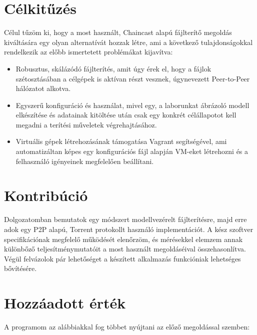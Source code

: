 \section{Célkitűzés}

Célul tűzöm ki, hogy a most használt, Chaincast alapú fájlterítő megoldás kiváltására egy olyan alternatívát hozzak létre, ami a következő tulajdonságokkal rendelkezik az előbb ismertetett problémákat kijavítva:

\begin{itemize}
  \item Robusztus, skálázódó fájlterítés, amit úgy érek el, hogy a fájlok szétosztásában a célgépek is aktívan részt vesznek, úgynevezett Peer-to-Peer\cite{p2pdef} hálózatot alkotva.
  \item Egyszerű konfiguráció és használat, mivel egy, a laborunkat ábrázoló modell elkészítése és adatainak kitöltése után csak egy konkrét célállapotot kell megadni a terítési műveletek végrehajtásához.
  \item Virtuális gépek létrehozásának támogatása Vagrant\cite{vagrant} segítségével, ami automatizáltan képes egy konfigurációs fájl alapján VM-eket létrehozni és a felhasználó igényeinek megfelelően beállítani.
\end{itemize}

\section{Kontribúció}
Dolgozatomban bemutatok egy módszert modellvezérelt fájlterítésre, majd erre adok egy P2P alapú, Torrent protokollt használó implementációt. A kész szoftver specifikációnak megfelelő működését elenőrzöm, és mérésekkel elemzem annak különbőző teljesítménymutatóit a most használt megoldáséival összehasonlítva. Végül felvázolok pár lehetőséget a készített alkalmazás funkcióniak lehetséges bővítésére.

\section{Hozzáadott érték}
A programom az alábbiakkal fog többet nyújtani az előző megoldással szemben:


